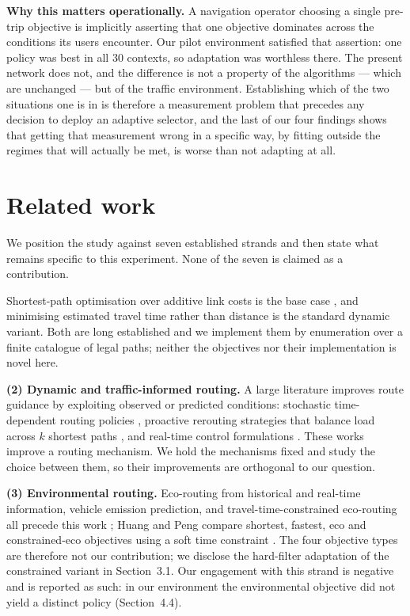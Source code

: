 \documentclass[10pt,a4paper]{article}
\begin{document}
\textbf{Why this matters operationally.} A navigation operator choosing a single pre-trip objective is implicitly asserting that one objective dominates across the conditions its users encounter. Our pilot environment satisfied that assertion: one policy was best in all 30 contexts, so adaptation was worthless there. The present network does not, and the difference is not a property of the algorithms --- which are unchanged --- but of the traffic environment. Establishing which of the two situations one is in is therefore a measurement problem that precedes any decision to deploy an adaptive selector, and the last of our four findings shows that getting that measurement wrong in a specific way, by fitting outside the regimes that will actually be met, is worse than not adapting at all.

\section{Related work}
We position the study against seven established strands and then state what remains specific to this experiment. None of the seven is claimed as a contribution.

Shortest-path optimisation over additive link costs is the base case \cite{dijkstra1959note}, and minimising estimated travel time rather than distance is the standard dynamic variant. Both are long established and we implement them by enumeration over a finite catalogue of legal paths; neither the objectives nor their implementation is novel here.

\textbf{(2) Dynamic and traffic-informed routing.} A large literature improves route guidance by exploiting observed or predicted conditions: stochastic time-dependent routing policies \cite{gao2006optimal,levering2021framework}, proactive rerouting strategies that balance load across $k$ shortest paths \cite{pan2013proactive}, and real-time control formulations \cite{pi2017stochastic}. These works improve a routing mechanism. We hold the mechanisms fixed and study the choice between them, so their improvements are orthogonal to our question.

\textbf{(3) Environmental routing.} Eco-routing from historical and real-time information, vehicle emission prediction, and travel-time-constrained eco-routing all precede this work \cite{boriboonsomsin2012ecorouting,zeng2016prediction,zeng2017svm}; Huang and Peng compare shortest, fastest, eco and constrained-eco objectives using a soft time constraint \cite{huang2018ecorouting}. The four objective types are therefore not our contribution; we disclose the hard-filter adaptation of the constrained variant in Section~3.1. Our engagement with this strand is negative and is reported as such: in our environment the environmental objective did not yield a distinct policy (Section~4.4).
\end{document}
